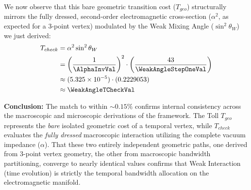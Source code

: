 We now observe that this bare geometric transition cost ($T_{geo}$) structurally mirrors the fully dressed, second-order electromagnetic cross-section ($\alpha^2$, as expected for a 3-point vertex) modulated by the Weak Mixing Angle ($\sin^2 \theta_W$) we just derived:
\begin{equation}
\begin{split}
T_{check} &= \alpha^2 \sin^2 \theta_W \\
&= \left(\frac{1}{\AlphaInvVal}\right)^2 \cdot \left(\frac{43}{\WeakAngleStepOneVal}\right) \\
&\approx (5.325 \times 10^{-5}) \cdot (0.2229053) \\
&\approx \WeakAngleTCheckVal
\end{split}
\end{equation}

\textbf{Conclusion:} The match to within $\sim 0.15\%$ confirms internal consistency across the macroscopic and microscopic derivations of the framework. The Toll $T_{geo}$ represents the \textit{bare} isolated geometric cost of a temporal vertex, while $T_{check}$ evaluates the \textit{fully dressed} macroscopic interaction utilizing the complete vacuum impedance ($\alpha$). That these two entirely independent geometric paths, one derived from 3-point vertex geometry, the other from macroscopic bandwidth partitioning, converge to nearly identical values confirms that Weak Interaction (time evolution) is strictly the temporal bandwidth allocation on the electromagnetic manifold.